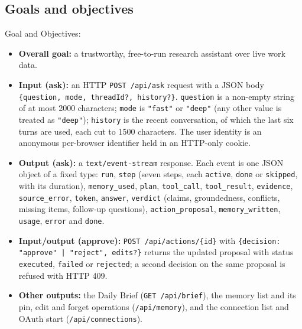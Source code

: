 \subsection{Goals and objectives}
Goal and Objectives:
\begin{itemize}
  	\item \textbf{Overall goal:} a trustworthy, free-to-run research assistant over live work data.
  	\item \textbf{Input (ask):} an HTTP \texttt{POST /api/ask} request with a JSON body \texttt{\{question, mode, threadId?, history?\}}. \texttt{question} is a non-empty string of at most 2000 characters; \texttt{mode} is \texttt{"fast"} or \texttt{"deep"} (any other value is treated as \texttt{"deep"}); \texttt{history} is the recent conversation, of which the last six turns are used, each cut to 1500 characters. The user identity is an anonymous per-browser identifier held in an HTTP-only cookie.
  	\item \textbf{Output (ask):} a \texttt{text/event-stream} response. Each event is one JSON object of a fixed type: \texttt{run}, \texttt{step} (seven steps, each \texttt{active}, \texttt{done} or \texttt{skipped}, with its duration), \texttt{memory\_used}, \texttt{plan}, \texttt{tool\_call}, \texttt{tool\_result}, \texttt{evidence}, \texttt{source\_error}, \texttt{token}, \texttt{answer}, \texttt{verdict} (claims, groundedness, conflicts, missing items, follow-up questions), \texttt{action\_proposal}, \texttt{memory\_written}, \texttt{usage}, \texttt{error} and \texttt{done}.
  	\item \textbf{Input/output (approve):} \texttt{POST /api/actions/\{id\}} with \texttt{\{decision: "approve" | "reject", edits?\}} returns the updated proposal with status \texttt{executed}, \texttt{failed} or \texttt{rejected}; a second decision on the same proposal is refused with HTTP 409.
  	\item \textbf{Other outputs:} the Daily Brief (\texttt{GET /api/brief}), the memory list and its pin, edit and forget operations (\texttt{/api/memory}), and the connection list and OAuth start (\texttt{/api/connections}).
\end{itemize}

